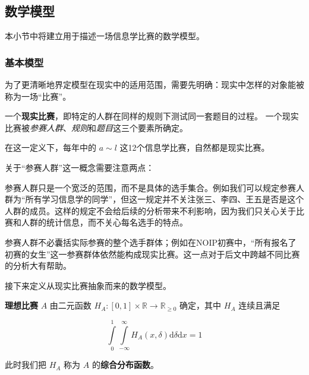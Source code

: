     \subsection{数学模型}

        本小节中将建立用于描述一场信息学比赛的数学模型。

        \subsubsection{基本模型}
        
            为了更清晰地界定模型在现实中的适用范围，需要先明确：现实中怎样的对象能被称为一场“比赛”。

            \begin{definition}[现实比赛]
                一个\textbf{现实比赛}，即特定的人群在同样的规则下测试同一套题目的过程。
                一个现实比赛被\emph{参赛人群}、\emph{规则}和\emph{题目}这三个要素所确定。
                \label{def:realContest}
            \end{definition}

            在这一定义下，每年中的 $a\sim l$ 这12个信息学比赛，自然都是现实比赛。
            
            \vspace{1.5ex}

            关于“参赛人群”这一概念需要注意两点：
            
            \begin{asparaitem}
                \item 参赛人群只是一个宽泛的范围，而不是具体的选手集合。例如我们可以规定参赛人群为“所有学习信息学的同学”，但这一规定并不关注张三、李四、王五是否是这个人群的成员。这样的规定不会给后续的分析带来不利影响，因为我们只关心关于比赛和人群的统计信息，而不关心每名选手的特点。
                \item 参赛人群不必囊括实际参赛的整个选手群体；例如在NOIP初赛中，“所有报名了初赛的女生”这一参赛群体依然能构成现实比赛。这一点对于后文中跨越不同比赛的分析大有帮助。
            \end{asparaitem}
            
            \vspace{1.5ex}

            接下来定义从现实比赛抽象而来的数学模型。

            \begin{definition}[理想比赛]
                \textbf{理想比赛} $A$ 由二元函数 $H_A:\left[0,1\right]\times\mathbb{R}\to\mathbb{R}_{\geq 0}$ 确定，其中 $H_A$ 连续且满足
                
                $$
                \int\limits_0^1\int\limits_{-\infty}^\infty H_A(x,\delta)\mathrm{d}\delta\mathrm{d}x=1
                $$

                此时我们把 $H_A$ 称为 $A$ 的\textbf{综合分布函数}。
                \label{def:idealContest}
            \end{definition}

